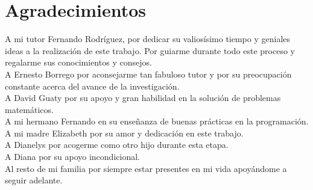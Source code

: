 \chapter*{Agradecimientos}\label{chapter:agradecimientos}

A mi tutor Fernando Rodríguez, por dedicar su valiosísimo tiempo y geniales ideas a la realización de este trabajo. Por guiarme durante todo este proceso y regalarme sus conocimientos y consejos.
\\

A Ernesto Borrego por aconsejarme tan fabuloso tutor y por su preocupación constante acerca del avance de la investigación.
\\

A David Guaty por su apoyo y gran habilidad en la solución de problemas matemáticos.
\\

A mi hermano Fernando en su enseñanza de buenas prácticas en la programación.
\\

A mi madre Elizabeth por su amor y dedicación en este trabajo.
\\

A Dianelys por acogerme como otro hijo durante esta etapa.
\\

A Diana por su apoyo incondicional.
\\

Al resto de mi familia por siempre estar presentes en mi vida apoyándome a seguir adelante.
